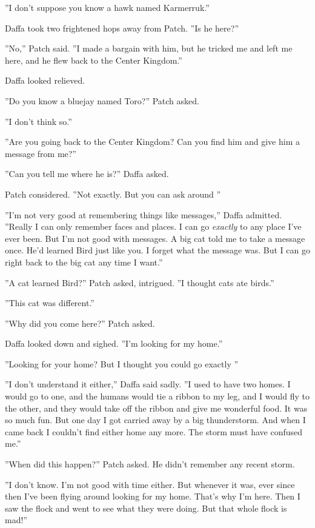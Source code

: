 \documentclass[12pt]{book}
\begin{document}
''I don't suppose you know a hawk named Karmerruk.''

Daffa took two frightened hops away from Patch. ''Is he here?''

''No,'' Patch said. ''I made a bargain with him, but he tricked me and left me here, and he flew back to the Center Kingdom.''

Daffa looked relieved.

''Do you know a bluejay named Toro?'' Patch asked.

''I don't think so.''

''Are you going back to the Center Kingdom? Can you find him and give him a message from me?''

''Can you tell me where he is?'' Daffa asked.

Patch considered. ''Not exactly. But you can ask around%
''

''I'm not very good at remembering things like messages,'' Daffa admitted. ''Really I can only remember faces and places. I can go {\it exactly} to any place I've ever been. But I'm not good with messages. A big cat told me to take a message once. He'd learned Bird just like you. I forget what the message was. But I can go right back to the big cat any time I want.''

''A cat learned Bird?'' Patch asked, intrigued. ''I thought cats ate birds.''

''This cat was different.''

''Why did you come here?'' Patch asked.

Daffa looked down and sighed. ''I'm looking for my home.''

''Looking for your home? But I thought you could go exactly %
''

''I don't understand it either,'' Daffa said sadly. ''I used to have two homes. I would go to one, and the humans would tie a ribbon to my leg, and I would fly to the other, and they would take off the ribbon and give me wonderful food. It was so much fun. But one day I got carried away by a big thunderstorm. And when I came back I couldn't find either home any more. The storm must have confused me.''

''When did this happen?'' Patch asked. He didn't remember any recent storm.

''I don't know. I'm not good with time either. But whenever it was, ever since then I've been flying around looking for my home. That's why I'm here. Then I saw the flock and went to see what they were doing. But that whole flock is mad!''
\end{document}
